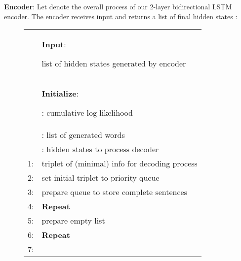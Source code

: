 \documentclass[11pt]{article}
\begin{document}
{\bf Encoder}: Let  denote the overall process of our 2-layer bidirectional LSTM encoder.
The encoder receives input  and returns a list of final hidden states :




\begin{figure}[t]
 \centering
 \tabcolsep=1pt
 \small
 \begin{tabular}{rp{71mm}}
  \hline
  \ &\hspace{-1.2em}\textbf{Input}:
  
  \hspace{\fill} { {\scriptsize list of hidden states generated by encoder}}
  \\
  \ &\hspace{-1.2em}\textbf{Initialize}:
      
      \hspace{\fill} {\scriptsize : cumulative log-likelihood}
      \\
  &\hspace{3.0em}
      
      \hspace{\fill} {\scriptsize : list of generated words}
      \\
  &\hspace{3.0em}
      
      \hspace{\fill} {\scriptsize : hidden states to process decoder}
      \\
1:&\hspace{0.0em}
      
      \hspace{\fill} {\scriptsize triplet of (minimal) info for decoding process}
      \\
  2:&\hspace{0.0em}
      
      \hspace{\fill} {\scriptsize set initial triplet  to priority queue }
      \\
  3:&\hspace{0.0em}
      
      \hspace{\fill} {\scriptsize prepare queue to store complete sentences}
      \\
  4:&\hspace{0.0em}
      \textbf{Repeat} \\
  5:&\hspace{3.0mm}
      
      \hspace{\fill} {\scriptsize prepare empty list}
      \\
  6:&\hspace{3.0mm}
      \textbf{Repeat} \\
  7:&\hspace{6.0mm}
      

\end{tabular}
\end{figure}
\end{document}
